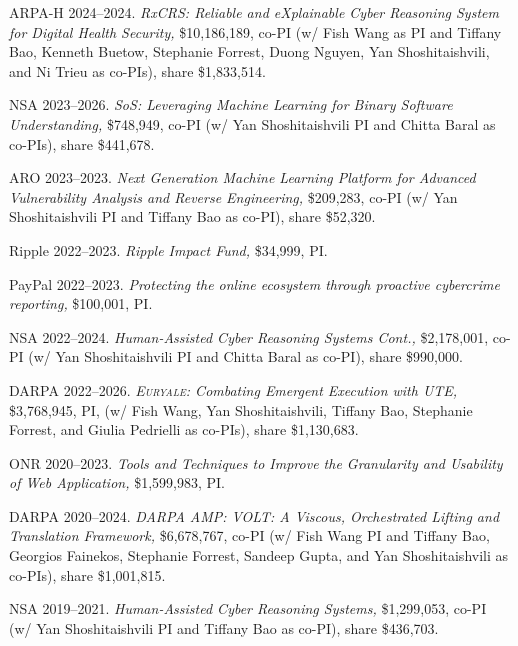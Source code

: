 \documentclass[11pt,letterpaper,sans]{moderncv}
\begin{document}
\begin{etaremune}

\item ARPA-H 2024--2024. \textit{RxCRS: Reliable and eXplainable Cyber Reasoning System for Digital Health Security,} \$10,186,189, co-PI (w/ Fish Wang as PI and Tiffany Bao, Kenneth Buetow, Stephanie Forrest, Duong Nguyen, Yan Shoshitaishvili, and Ni Trieu as co-PIs), share \$1,833,514.

\item NSA 2023--2026. \textit{SoS: Leveraging Machine Learning for Binary Software Understanding,} \$748,949, co-PI (w/ Yan Shoshitaishvili PI and Chitta Baral as co-PIs), share \$441,678.  

\item ARO 2023--2023. \textit{Next Generation Machine Learning Platform for Advanced Vulnerability Analysis and Reverse Engineering,} \$209,283, co-PI (w/ Yan Shoshitaishvili PI and Tiffany Bao as co-PI), share \$52,320.
  
\item Ripple 2022--2023. \textit{Ripple Impact Fund,} \$34,999, PI.
  
\item PayPal 2022--2023. \textit{Protecting the online ecosystem through proactive cybercrime reporting,} \$100,001, PI.

\item NSA 2022--2024. \textit{Human-Assisted Cyber Reasoning Systems Cont.,} \$2,178,001, co-PI (w/ Yan Shoshitaishvili PI and Chitta Baral as co-PI), share \$990,000.
  
\item DARPA 2022--2026. \textit{\textsc{Euryale}: Combating Emergent Execution with UTE,} \$3,768,945, PI, (w/ Fish Wang, Yan Shoshitaishvili, Tiffany Bao, Stephanie Forrest, and Giulia Pedrielli as co-PIs), share \$1,130,683.

\item ONR 2020--2023. \textit{Tools and Techniques to Improve the Granularity and Usability of Web Application,} \$1,599,983, PI.

  \item DARPA 2020--2024. \textit{DARPA AMP: VOLT: A Viscous, Orchestrated Lifting and Translation Framework,} \$6,678,767, co-PI (w/ Fish Wang PI and Tiffany Bao, Georgios Fainekos, Stephanie Forrest, Sandeep Gupta, and Yan Shoshitaishvili as co-PIs), share \$1,001,815.

  \item NSA 2019--2021. \textit{Human-Assisted Cyber Reasoning Systems,} \$1,299,053, co-PI (w/ Yan Shoshitaishvili PI and Tiffany Bao as co-PI), share \$436,703.


\end{etaremune}
\end{document}

